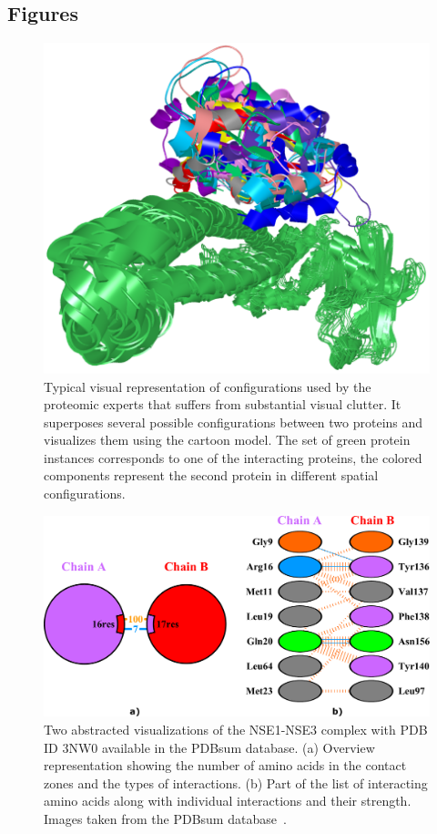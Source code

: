 \documentclass{bmcart}
\begin{document}
\begin{backmatter}
\section*{Figures}
  \begin{figure}[h!]
  \centering
  \includegraphics[width=0.9\columnwidth]{images/figure1.png}
 \caption{
	Typical visual representation of configurations used by the proteomic experts that suffers from substantial visual clutter. It superposes several possible configurations between two proteins and visualizes them using the cartoon model. The set of green protein instances corresponds to one of the interacting proteins, the colored components represent the second protein in different spatial configurations.}
  \label{fig:problem}
\end{figure}

\begin{figure}[h!]
  \centering	
  \includegraphics[width=0.9\columnwidth]{images/figure2.pdf}
  \caption{
    Two abstracted visualizations of the NSE1-NSE3 complex with PDB ID 3NW0 available in the PDBsum database. (a) Overview representation showing the number of amino acids in the contact zones and the types of interactions. (b) Part of the list of interacting amino acids along with individual interactions and their strength. Images taken from the PDBsum database~\cite{pdbsum}.}
    \label{fig:pdbsum}
\end{figure}


\end{backmatter}
\end{document}
